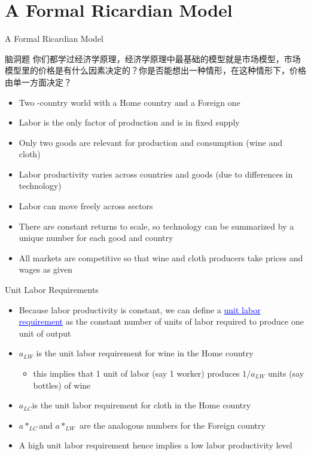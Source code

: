 \documentclass[10pt,hyperref={CJKbookmarks=true},xcolor=dvipsnames,aspectratio=169]{beamer}
\begin{document}
\section{A Formal Ricardian Model}
\begin{frame}{A Formal Ricardian Model }

	\begin{block}{脑洞题}
		你们都学过经济学原理，经济学原理中最基础的模型就是市场模型，市场模型里的价格是有什么因素决定的？你是否能想出一种情形，在这种情形下，价格由单一方面决定？
	\end{block}
\begin{itemize}
\item Two -country world with a Home country and a Foreign one 
\item Labor is the only factor of production and is in fixed supply 
\item Only two goods are relevant for production and consumption (wine and
cloth) 
\item Labor productivity varies across countries and goods (due to differences
in technology) 
\item Labor can move freely across sectors 
\item There are constant returns to scale, so technology can be summarized
by a unique number for each good and country 
\item All markets are competitive so that wine and cloth producers take
prices and wages as given 
\end{itemize}
\end{frame}

\begin{frame}{Unit Labor Requirements }

\begin{itemize}
\item Because labor productivity is constant, we can define a \textcolor{blue}{\uline{unit
labor requirement}} as the constant number of units of labor required
to produce one unit of output 
\item $a_{LW}$ is the unit labor requirement for wine in the Home country 

\begin{itemize}
\item this implies that 1 unit of labor (say 1 worker) produces $1/a_{LW}$
units (say bottles) of wine 
\end{itemize}
\item $a_{LC}$is the unit labor requirement for cloth in the Home country 
\item $a*_{LC}$and $a*_{LW}$ are the analogous numbers for the Foreign
country 
\item A high unit labor requirement hence implies a low labor productivity
level
\end{itemize}
\end{frame}
\end{document}
